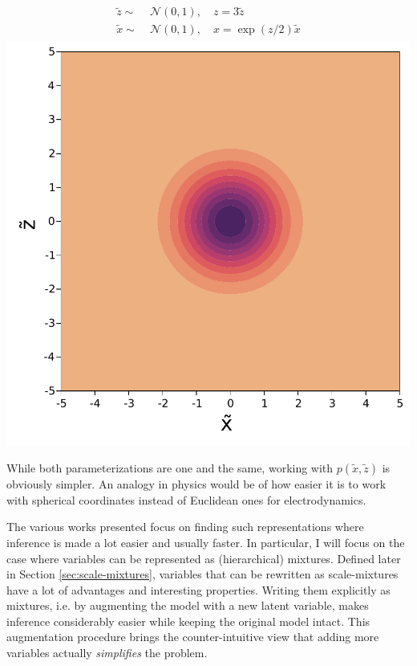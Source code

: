 \begin{minipage}{0.5\textwidth}
    \centering
    \begin{align}
        \begin{aligned}
            \tilde{z} \sim&\; \mathcal{N}(0, 1),\quad z = 3\tilde{z}\\
            \tilde{x} \sim&\; \mathcal{N}(0, 1),\quad x = \exp(z/2)\tilde{x}
        \end{aligned}
    \end{align}
    \includegraphics[width=\textwidth]{./chapters/1_introduction/figures/neals_funnel_non_centered.pdf}
    \label{fig:neals_noncentered}
\end{minipage}
\vspace{0.5cm}

While both parameterizations are one and the same, working with $p(\tilde{x},\tilde{z})$ is obviously simpler.
An analogy in physics would be of how easier it is to work with spherical coordinates instead of Euclidean ones for electrodynamics. 

The various works presented focus on finding such representations where inference is made a lot easier and usually faster.
In particular, I will focus on the case where variables can be represented as (hierarchical) mixtures.
Defined later in Section \ref{sec:scale-mixtures}, variables that can be rewritten as scale-mixtures have a lot of advantages and interesting properties.
Writing them explicitly as mixtures, i.e. by augmenting the model with a new latent variable, makes inference considerably easier while keeping the original model intact.
This augmentation procedure brings the counter-intuitive view that adding more variables actually \textit{simplifies} the problem.

